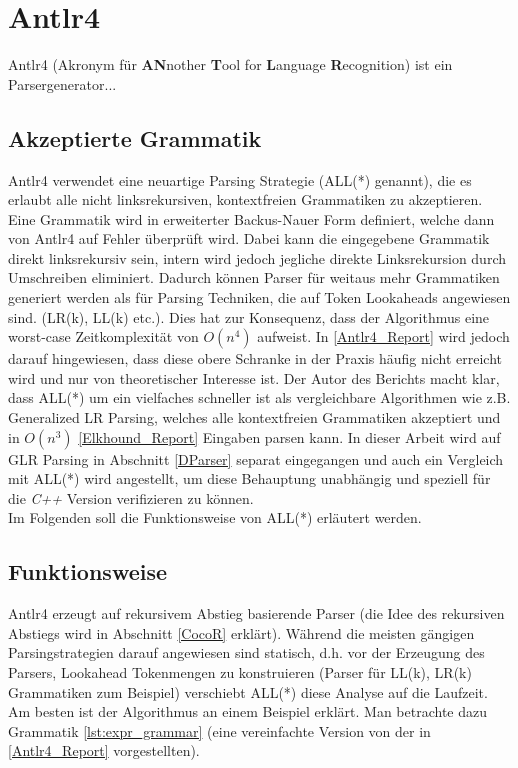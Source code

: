 \section{Antlr4}
Antlr4 (Akronym für \textbf{AN}nother \textbf{T}ool for \textbf{L}anguage \textbf{R}ecognition)
ist ein Parsergenerator...
\subsection{Akzeptierte Grammatik}
Antlr4 verwendet eine neuartige Parsing Strategie (ALL(*) genannt), die es erlaubt alle nicht linksrekursiven, kontextfreien Grammatiken zu akzeptieren.
Eine Grammatik wird in erweiterter Backus-Nauer Form definiert, welche dann von Antlr4 auf Fehler überprüft wird. Dabei kann die eingegebene Grammatik direkt linksrekursiv sein,
intern wird jedoch jegliche direkte Linksrekursion durch Umschreiben eliminiert. Dadurch können Parser für weitaus mehr Grammatiken generiert werden als für Parsing Techniken, 
die auf Token Lookaheads angewiesen sind. (LR(k), LL(k) etc.). Dies hat zur Konsequenz, dass der Algorithmus eine worst-case Zeitkomplexität von $O(n^4)$ aufweist. 
In \ref{Antlr4_Report} wird jedoch darauf hingewiesen, dass diese obere Schranke in der Praxis häufig nicht erreicht wird und nur von theoretischer Interesse ist. 
Der Autor des Berichts macht klar, dass ALL(*) um ein vielfaches schneller ist als vergleichbare Algorithmen wie z.B. Generalized LR Parsing, welches alle kontextfreien
Grammatiken akzeptiert und in $O(n^3)$ \ref{Elkhound_Report} Eingaben parsen kann. In dieser Arbeit wird auf GLR Parsing in Abschnitt \ref{DParser} separat eingegangen und auch 
ein Vergleich mit ALL(*) wird angestellt, um diese Behauptung unabhängig und speziell für die \textit{C++} Version verifizieren zu können.\\
Im Folgenden soll die Funktionsweise von ALL(*) erläutert werden. 
\subsection{Funktionsweise}
Antlr4 erzeugt auf rekursivem Abstieg basierende Parser (die Idee des rekursiven Abstiegs wird in Abschnitt \ref{CocoR} erklärt). Während die meisten gängigen Parsingstrategien darauf angewiesen sind
statisch, d.h. vor der Erzeugung des Parsers, Lookahead Tokenmengen zu konstruieren (Parser für LL(k), LR(k) Grammatiken zum Beispiel) verschiebt ALL(*) diese Analyse auf die Laufzeit. 
Am besten ist der Algorithmus an einem Beispiel erklärt. 
Man betrachte dazu Grammatik \ref{lst:expr_grammar} (eine vereinfachte Version von der in \ref{Antlr4_Report} vorgestellten). 

